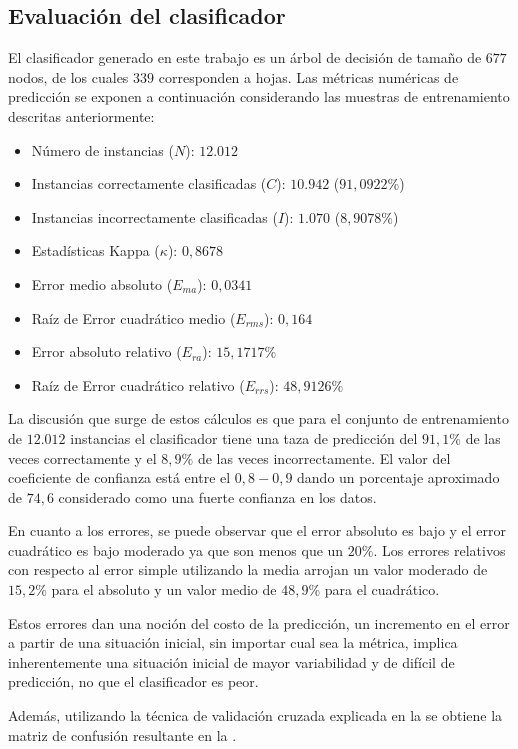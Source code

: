 \subsection{Evaluación del clasificador}

El clasificador generado en este trabajo es un árbol de decisión de
tamaño de $677$ nodos, de los cuales $339$ corresponden a hojas.
Las métricas numéricas de predicción se exponen a continuación considerando
las muestras de entrenamiento descritas anteriormente: 
\begin{itemize}
\item Número de instancias ($N$): $12.012$ 
\item Instancias correctamente clasificadas ($C$): $10.942$ ($91,0922\%$)
\item Instancias incorrectamente clasificadas ($I$): $1.070$ ($8,9078\%$)
\item Estadísticas Kappa ($\kappa$): $0,8678$ 
\item Error medio absoluto ($E_{ma}$): $0,0341$
\item Raíz de Error cuadrático medio ($E_{rms}$): $0,164$ 
\item Error absoluto relativo ($E_{ra}$): $15,1717\%$ 
\item Raíz de Error cuadrático relativo ($E_{rrs}$): $48,9126\%$ 
\end{itemize}
La discusión que surge de estos cálculos es que para el conjunto de
entrenamiento de $12.012$ instancias el clasificador tiene una taza
de predicción del $91,1\%$ de las veces correctamente y el $8,9\%$
de las veces incorrectamente. El valor del coeficiente de confianza
está entre el $0,8-0,9$ dando un porcentaje aproximado de $74,6%
$ considerado como una fuerte confianza en los datos.

En cuanto a los errores, se puede observar que el error absoluto es
bajo y el error cuadrático es bajo moderado ya que son menos que un
$20\%$. Los errores relativos con respecto al error simple utilizando
la media arrojan un valor moderado de $15,2\%$ para el absoluto y
un valor medio de $48,9\%$ para el cuadrático. 

Estos errores dan una noción del costo de la predicción, un incremento
en el error a partir de una situación inicial, sin importar cual sea
la métrica, implica inherentemente una situación inicial de mayor
variabilidad y de difícil de predicción, no que el clasificador es
peor.

Además, utilizando la técnica de validación cruzada explicada en la
 se obtiene la matriz de confusión resultante
en la . 

